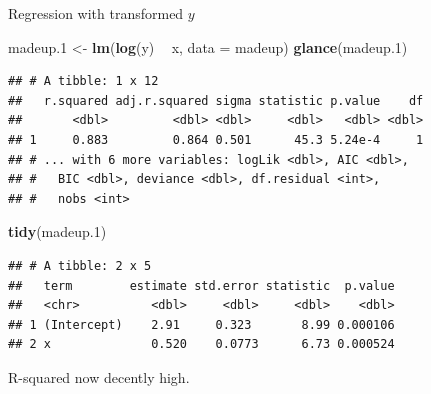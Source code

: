 \documentclass[
  ignorenonframetext,
]{beamer}
\newenvironment{Shaded}{\begin{snugshade}}{\end{snugshade}}
\newcommand{\DataTypeTok}[1]{\textcolor[rgb]{0.13,0.29,0.53}{#1}}
\newcommand{\FloatTok}[1]{\textcolor[rgb]{0.00,0.00,0.81}{#1}}
\newcommand{\KeywordTok}[1]{\textcolor[rgb]{0.13,0.29,0.53}{\textbf{#1}}}
\newcommand{\NormalTok}[1]{#1}
\newcommand{\OperatorTok}[1]{\textcolor[rgb]{0.81,0.36,0.00}{\textbf{#1}}}
\newcommand{\StringTok}[1]{\textcolor[rgb]{0.31,0.60,0.02}{#1}}
\begin{document}
\begin{frame}[fragile]{Regression with transformed \(y\)}
\protect\hypertarget{regression-with-transformed-y}{}

\footnotesize

\begin{Shaded}
\begin{Highlighting}[]
\NormalTok{madeup}\FloatTok{.1}\NormalTok{ <-}\StringTok{ }\KeywordTok{lm}\NormalTok{(}\KeywordTok{log}\NormalTok{(y) }\OperatorTok{~}\StringTok{ }\NormalTok{x, }\DataTypeTok{data =}\NormalTok{ madeup)}
\KeywordTok{glance}\NormalTok{(madeup}\FloatTok{.1}\NormalTok{)}
\end{Highlighting}
\end{Shaded}

\begin{verbatim}
## # A tibble: 1 x 12
##   r.squared adj.r.squared sigma statistic p.value    df
##       <dbl>         <dbl> <dbl>     <dbl>   <dbl> <dbl>
## 1     0.883         0.864 0.501      45.3 5.24e-4     1
## # ... with 6 more variables: logLik <dbl>, AIC <dbl>,
## #   BIC <dbl>, deviance <dbl>, df.residual <int>,
## #   nobs <int>
\end{verbatim}

\begin{Shaded}
\begin{Highlighting}[]
\KeywordTok{tidy}\NormalTok{(madeup}\FloatTok{.1}\NormalTok{)}
\end{Highlighting}
\end{Shaded}

\begin{verbatim}
## # A tibble: 2 x 5
##   term        estimate std.error statistic  p.value
##   <chr>          <dbl>     <dbl>     <dbl>    <dbl>
## 1 (Intercept)    2.91     0.323       8.99 0.000106
## 2 x              0.520    0.0773      6.73 0.000524
\end{verbatim}

\normalsize

R-squared now decently high.

\end{frame}
\end{document}
